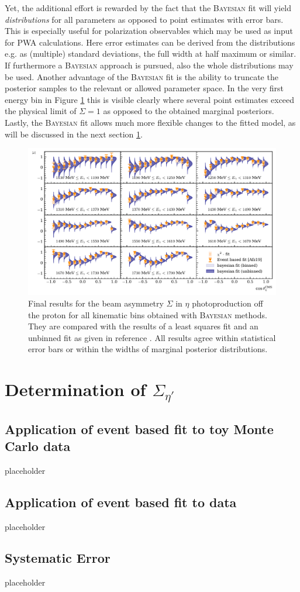 Yet, the additional effort is rewarded by the fact that the \textsc{Bayesian} fit will yield \emph{distributions} for all parameters as opposed to point estimates with error bars. This is especially useful for polarization observables which may be used as input for PWA calculations. Here error estimates can be derived from the distributions e.g. as (multiple) standard deviations, the full width at half maximum or similar. If furthermore a \textsc{Bayesian} approach is  pursued, also the whole distributions may be used. Another advantage of the \textsc{Bayesian} fit is the ability to truncate the posterior samples to the relevant or allowed parameter space. In the very first energy bin in Figure \ref{fig:eta_res} this is visible clearly where several point estimates exceed the physical limit of $\Sigma=1$ as opposed to the obtained marginal posteriors. Lastly, the \textsc{Bayesian} fit allows much more flexible changes to the fitted model, as will be discussed in the next section \ref{sec:sigma_etap}.
\begin{landscape}
	\begin{figure}[htbp]
		\centering
		\includegraphics[width=\linewidth,height=.8\textwidth]{../bayes/event_based_fit/plots/sigma_eta.pdf}
		\caption{Final results for the beam asymmetry $\Sigma$ in $\eta$ photoproduction off the proton for all kinematic bins obtained with \textsc{Bayesian} methods. They are compared with the results of a least squares fit and an unbinned fit as given in reference \cite{farahphd}. All results agree within statistical error bars or within the widths of marginal posterior distributions.}
		\label{fig:eta_res}
	\end{figure}
\end{landscape}
      
\section{Determination of $\Sigma_{\eta'}$}
\label{sec:sigma_etap}
\subsection{Application of event based fit to toy Monte Carlo data}
placeholder
\subsection{Application of event based fit to data}
placeholder
\subsection{Systematic Error}
placeholder
